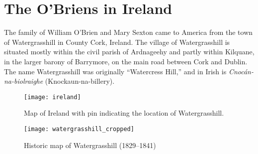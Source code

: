 \chapter{The O'Briens in Ireland}

The family of William O'Brien and Mary Sexton came to America from the town of Watergrasshill in County Cork, Ireland.\cite{Edward2OBrienNaturalization:1,Michael2OBrienNaturalization:1,Margaret3DooleyBaptism:1} The village of Watergrasshill is situated mostly within the civil parish of Ardnageehy and partly within Kilquane, in the larger barony of Barrymore, on the main road between Cork and Dublin.\cite{TopographicalDictionary} The name Watergrasshill was originally ``Watercress Hill,'' and in Irish is \textit{Cnoc\'{a}n-na-biolraighe} (Knockaun-na-billery).\cite{LocalNames}

\begin{figure}
	\centering
	\texttt{[image: ireland]}
	\caption{Map of Ireland with pin indicating the location of Watergrasshill.}
	\label{fig:IrelandMap}
\end{figure}

\begin{figure}
	\centering
	\texttt{[image: watergrasshill\_cropped]}
	\caption{Historic map of Watergrasshill (1829--1841)}
	\label{fig:WatergrasshillMap}
\end{figure}

